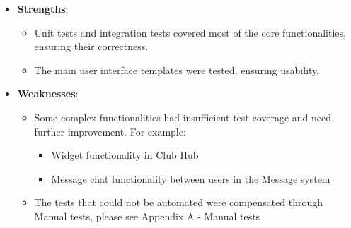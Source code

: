 \begin{itemize}
\item
  \textbf{Strengths}:

  \begin{itemize}
  \item
    Unit tests and integration tests covered most of the core
    functionalities, ensuring their correctness.
  \item
    The main user interface templates were tested, ensuring usability.
  \end{itemize}
\item
  \textbf{Weaknesses}:

  \begin{itemize}
  \item
    Some complex functionalities had insufficient test coverage and need
    further improvement. For example:

    \begin{itemize}
    \item
      Widget functionality in Club Hub
    \item
      Message chat functionality between users in the Message system
    \end{itemize}
  \item
    The tests that could not be automated were compensated through
    Manual tests, please see Appendix A - Manual tests
  \end{itemize}
\end{itemize}